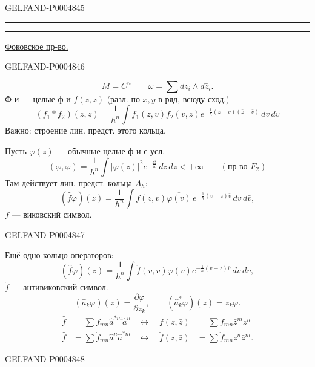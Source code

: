 \begin{GelfandAdjacentEvidence}{GELFAND-P000484}{5}


{\centering\rule{1.9em}{.7pt}\quad\textbullet\quad\rule{1.9em}{.7pt}\par}

\uline{Фоковское пр-во.}
\end{GelfandAdjacentEvidence}
\begin{GelfandAdjacentEvidence}{GELFAND-P000484}{6}

\[
M=C^n\qquad\omega=\sum dz_i\wedge d\bar z_i.
\]
Ф-и — целые ф-и $f(z,\bar z)$ (разл. по $x,y$ в ряд, всюду сход.)
\[
(f_1\ast f_2)(z,\bar z)=\frac1{h^n}
\int f_1(z,\bar v)f_2(v,\bar z)
 e^{-\frac1h(z-v)(\bar z-\bar v)}\,dv\,d\bar v
\]
Важно: строение лин. предст. этого кольца.

Пусть $\varphi(z)$ — обычные целые ф-и с усл.
\[
(\varphi,\varphi)=\frac1{h^n}
\int|\varphi(z)|^2e^{-\frac{z\bar z}{h}}\,dz\,d\bar z
<+\infty\qquad(\text{пр-во }F_2)
\]
Там действует лин. предст. кольца $A_h$:
\[
(\hat f\varphi)(z)=\frac1{h^n}\int
 f(z,v)\overline{\varphi(v)}\,
 e^{-\frac1h(v-z)\bar v}\,dv\,d\bar v,
\]
$f$ — виковский символ.
\end{GelfandAdjacentEvidence}
\begin{GelfandAdjacentEvidence}{GELFAND-P000484}{7}


Ещё одно кольцо операторов:
\[
(\hat f\varphi)(z)=\frac1{h^n}\int
 \mathring{f}(v,\bar v)\varphi(v)
 e^{-\frac1h(v-z)\bar v}\,dv\,d\bar v,
\]
$\mathring{f}$ — антивиковский символ.
\[
(\hat a_k\varphi)(z)=\frac{\partial\varphi}{\partial z_k},
\qquad(\hat a_k^*\varphi)(z)=z_k\varphi.
\]
\[
\begin{aligned}
\hat f&=\sum f_{mn}\hat a^{*m}\hat a^n
&\longleftrightarrow\quad
f(z,\bar z)&=\sum f_{mn}\bar z^m z^n\\
\hat f&=\sum\mathring{f}_{mn}\hat a^n\hat a^{*m}
&\longleftrightarrow\quad
\mathring{f}(z,\bar z)&=\sum\mathring{f}_{mn}z^n\bar z^m.
\end{aligned}
\]
\end{GelfandAdjacentEvidence}
\begin{GelfandAdjacentEvidence}{GELFAND-P000484}{8}

\end{GelfandAdjacentEvidence}



